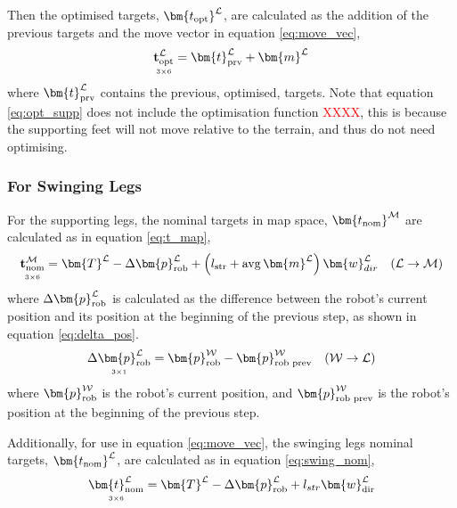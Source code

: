     Then the optimised targets, \(\bm{t_\text{opt}} \inrefframe{L}\), are calculated as the addition of the previous targets and the move vector in equation \ref{eq:move_vec},
    \begin{equation} \label{eq:opt_supp}
        \mdim{\bf{t}_\text{opt}\inrefframe{L}}{3}{6} = \bm{t}_\text{prv}\inrefframe{L} + \bm{m}\inrefframe{L}
    \end{equation}
    where \(\bm{t}_\text{prv}\inrefframe{L}\) contains the previous, optimised, targets. Note that equation \ref{eq:opt_supp} does not include the optimisation
    function \textcolor{red}{XXXX}, this is because the supporting feet will not move relative to the terrain, and thus do not need optimising.

    \subsubsection{For Swinging Legs} \label{sec:swing}
    For the supporting legs, the nominal targets in map space, \(\bm{t_\text{nom}} \inrefframe{M}\) are calculated as in equation \ref{eq:t_map},
    \begin{equation} \label{eq:t_map}
        \mdim{\bf{t}_\text{nom}\inrefframe{M}}{3}{6} = \bm{T}\inrefframe{L} - \Delta\bm{p}_\text{rob}\inrefframe{L} + \left(l_\text{str}+\avg \bm{m}\inrefframe{L}\right)\bm{w}_{dir}\inrefframe{L} \transframe{L}{M}
    \end{equation}
    where \(\Delta\bm{p}_\text{rob}\inrefframe{L}\) is calculated as the difference between the robot's current position and its position at 
    the beginning of the previous step, as shown in equation \ref{eq:delta_pos}.
    \begin{equation}\label{eq:delta_pos}
        \mdim{\Delta\bm{p}_\text{rob}\inrefframe{L}}{3}{1} = \bm{p}_\text{rob}\inrefframe{W}-\bm{p}_\text{rob prev}\inrefframe{W} \transframe{W}{L}
    \end{equation}
    where \(\bm{p}_\text{rob} \inrefframe{W}\) is the robot's current position, and \(\bm{p}_\text{rob prev}\inrefframe{W}\) is the robot's position at the beginning of the previous step.

    Additionally, for use in equation \ref{eq:move_vec}, the swinging legs nominal targets, \(\bm{t_\text{nom}} \inrefframe{L}\), are calculated as 
    in equation \ref{eq:swing_nom},
    \begin{equation} \label{eq:swing_nom}
        \mdim{\bm{t}_\text{nom}\inrefframe{L}}{3}{6} = \bm{T}\inrefframe{L} - \Delta\bm{p}_\text{rob}\inrefframe{L} + l_{str}\bm{w}_\text{dir}\inrefframe{L}
    \end{equation}

